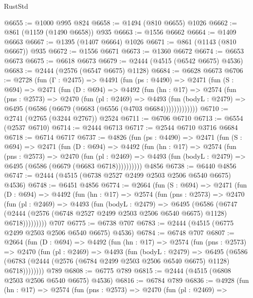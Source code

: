 \begin{lexlean}{RustStd}
\begin{coremodule}
@6655 := @1000 @995 @824
@6658 := @1494 (@810 @6655) @1026
@6662 := @861 (@1159 (@1490 @6658)) @935
@6663 := @1556 @6662
@6664 := @1409 @6663
@6667 := @1395 (@1407 @6664) @1026
@6671 := @861 (@1143 (@810 @6667)) @935
@6672 := @1556 @6671
@6673 := @1360 @6672
@6674 := @6653 @6673
@6675 := @6618 @6673
@6679 := @2444 (@4515 (@6542 @6675) @4536)
@6683 := @2444 (@2576 (@6547 @6675) @1128)
@6684 := @6628 @6673
@6706 := @2728
    (fun (Γ : @2475) =>
    @4491
      (fun (ps : @4490) =>
      @2471
        (fun (S : @694) =>
        @2471
          (fun (D : @694) =>
          @4492
            (fun (hn : @17) =>
            @2574
              (fun (pns : @2573) =>
              @2470
                (fun (pl : @2469) =>
                @4493
                  (fun (bodyL : @2479) =>
                  @6495 (@6586 (@6679 (@6683 (@6556 (@4703 @6684)))))))))))))
@6710 := @2741 (@2765 (@3244 @2767)) @2524
@6711 := @6706 @6710
@6713 := @6554 (@2537 @6710)
@6714 := @2444 @6713
@6717 := @2544 @6710 @3716 @6684
@6718 := @6714 @6717
@6737 := @4826
    (fun (ps : @4490) =>
    @2471
      (fun (S : @694) =>
      @2471
        (fun (D : @694) =>
        @4492
          (fun (hn : @17) =>
          @2574
            (fun (pns : @2573) =>
            @2470
              (fun (pl : @2469) =>
              @4493 (fun (bodyL : @2479) => @6495 (@6586 (@6679 (@6683 @6718))))))))))
    @4856
@6738 := @6440 @4856
@6747 := @2444 (@4515 (@6738 @2527 @2499 @2503 @2506 @6540 @6675) @4536)
@6748 := @6451 @4856
@6774 := @2664
    (fun (S : @694) =>
    @2471
      (fun (D : @694) =>
      @4492
        (fun (hn : @17) =>
        @2574
          (fun (pns : @2573) =>
          @2470
            (fun (pl : @2469) =>
            @4493
              (fun (bodyL : @2479) =>
              @6495
                (@6586
                  (@6747
                    (@2444 (@2576 (@6748 @2527 @2499 @2503 @2506 @6540 @6675) @1128) @6718)))))))))
    @707
@6775 := @6738 @707
@6783 := @2444 (@4515 (@6775 @2499 @2503 @2506 @6540 @6675) @4536)
@6784 := @6748 @707
@6807 := @2664
    (fun (D : @694) =>
    @4492
      (fun (hn : @17) =>
      @2574
        (fun (pns : @2573) =>
        @2470
          (fun (pl : @2469) =>
          @4493
            (fun (bodyL : @2479) =>
            @6495
              (@6586 (@6783 (@2444 (@2576 (@6784 @2499 @2503 @2506 @6540 @6675) @1128) @6718))))))))
    @789
@6808 := @6775 @789
@6815 := @2444 (@4515 (@6808 @2503 @2506 @6540 @6675) @4536)
@6816 := @6784 @789
@6836 := @4928
    (fun (hn : @17) =>
    @2574
      (fun (pns : @2573) =>
      @2470
        (fun (pl : @2469) =>

\end{coremodule}
\end{lexlean}
